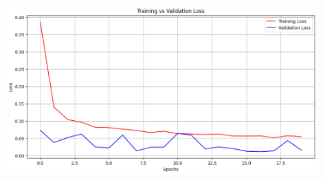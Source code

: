 \newpage

\renewcommand{\thefigure}{2.\arabic{figure}} %

\includegraphics[width=0.9\textwidth]{Assets/validation_loss/CONVNEXT.png}
